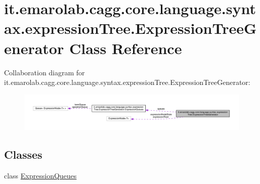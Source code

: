 \hypertarget{classit_1_1emarolab_1_1cagg_1_1core_1_1language_1_1syntax_1_1expressionTree_1_1ExpressionTreeGenerator}{\section{it.\-emarolab.\-cagg.\-core.\-language.\-syntax.\-expression\-Tree.\-Expression\-Tree\-Generator Class Reference}
\label{classit_1_1emarolab_1_1cagg_1_1core_1_1language_1_1syntax_1_1expressionTree_1_1ExpressionTreeGenerator}
}


Collaboration diagram for it.\-emarolab.\-cagg.\-core.\-language.\-syntax.\-expression\-Tree.\-Expression\-Tree\-Generator\-:\nopagebreak
\begin{figure}[H]
\begin{center}
\leavevmode
\includegraphics[width=350pt]{classit_1_1emarolab_1_1cagg_1_1core_1_1language_1_1syntax_1_1expressionTree_1_1ExpressionTreeGenerator__coll__graph}
\end{center}
\end{figure}
\subsection*{Classes}
\begin{DoxyCompactItemize}
\item 
class \hyperlink{classit_1_1emarolab_1_1cagg_1_1core_1_1language_1_1syntax_1_1expressionTree_1_1ExpressionTreeGenerator_1_1ExpressionQueues}{Expression\-Queues}
\end{DoxyCompactItemize}
